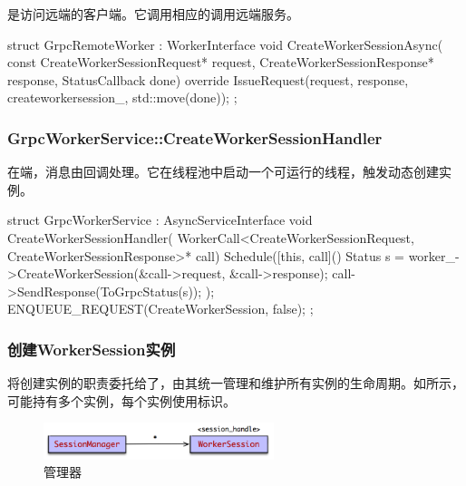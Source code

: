 \begin{content}
是访问远端的客户端。它调用相应的调用远端服务。

\begin{leftbar}
\begin{c++}
struct GrpcRemoteWorker : WorkerInterface {
  void CreateWorkerSessionAsync(
      const CreateWorkerSessionRequest* request,
      CreateWorkerSessionResponse* response,
      StatusCallback done) override {
    IssueRequest(request, response, createworkersession_, std::move(done));
  }
};
\end{c++}
\end{leftbar}

\subsubsection{GrpcWorkerService::CreateWorkerSessionHandler}

在端，消息由回调处理。它在线程池中启动一个可运行的线程，触发动态创建实例。

\begin{leftbar}
\begin{c++}
struct GrpcWorkerService : AsyncServiceInterface {
  void CreateWorkerSessionHandler(
      WorkerCall<CreateWorkerSessionRequest, CreateWorkerSessionResponse>*
          call) {
    Schedule([this, call]() {
      Status s = worker_->CreateWorkerSession(&call->request, &call->response);
      call->SendResponse(ToGrpcStatus(s));
    });
    ENQUEUE_REQUEST(CreateWorkerSession, false);
  }
};
\end{c++}
\end{leftbar}

\subsubsection{创建WorkerSession实例}

将创建实例的职责委托给了，由其统一管理和维护所有实例的生命周期。如所示，可能持有多个实例，每个实例使用标识。

\begin{figure}[H]
\centering
\includegraphics[width=0.6\textwidth]{figures/dist-worker-session-manager.png}
\caption{管理器}
 \label{fig:dist-worker-session-manager}
\end{figure}


\end{content}
